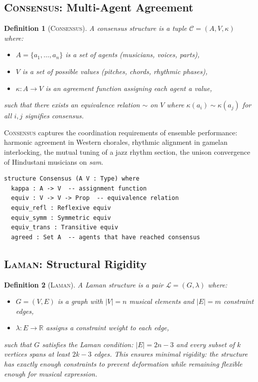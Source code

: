\documentclass[cmj]{article}
\newtheorem{definition}{Definition}
\newcommand{\R}{\mathbb{R}}
\newcommand{\CONSENSUS}{\textsc{Consensus}}
\newcommand{\LAMAN}{\textsc{Laman}}
\begin{document}
\subsection{\CONSENSUS{}: Multi-Agent Agreement}
\label{sec:primitive-consensus}

\begin{definition}[\CONSENSUS{}]
A \emph{consensus structure} is a tuple $\mathcal{C} = (A, V, \kappa)$ where:
\begin{itemize}[nosep]
  \item $A = \{a_1, \ldots, a_n\}$ is a set of \emph{agents} (musicians,
    voices, parts),
  \item $V$ is a set of possible \emph{values} (pitches, chords, rhythmic
    phases),
  \item $\kappa: A \to V$ is an \emph{agreement function} assigning each
    agent a value,
\end{itemize}
such that there exists an equivalence relation $\sim$ on $V$ where $\kappa(a_i)
\sim \kappa(a_j)$ for all $i, j$ signifies consensus.
\end{definition}

\CONSENSUS{} captures the coordination requirements of ensemble performance:
harmonic agreement in Western chorales, rhythmic alignment in gamelan
interlocking, the mutual tuning of a jazz rhythm section, the unison
convergence of Hindustani musicians on \emph{sam}.

\begin{lstlisting}[style=lean,caption={Lean 4 formalization of CONSENSUS}]
structure Consensus (A V : Type) where
  kappa : A -> V  -- assignment function
  equiv : V -> V -> Prop  -- equivalence relation
  equiv_refl : Reflexive equiv
  equiv_symm : Symmetric equiv
  equiv_trans : Transitive equiv
  agreed : Set A  -- agents that have reached consensus
\end{lstlisting}

\subsection{\LAMAN{}: Structural Rigidity}
\label{sec:primitive-laman}

\begin{definition}[\LAMAN{}]
A \emph{Laman structure} is a pair $\mathcal{L} = (G, \lambda)$ where:
\begin{itemize}[nosep]
  \item $G = (V, E)$ is a graph with $|V| = n$ musical elements and
    $|E| = m$ constraint edges,
  \item $\lambda: E \to \R$ assigns a constraint weight to each edge,
\end{itemize}
such that $G$ satisfies the \emph{Laman condition}: $|E| = 2n - 3$ and every
subset of $k$ vertices spans at least $2k - 3$ edges. This ensures
\emph{minimal rigidity}: the structure has exactly enough constraints to
prevent deformation while remaining flexible enough for musical expression.
\end{definition}
\end{document}

